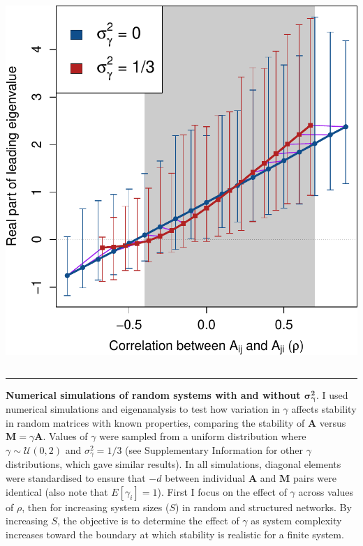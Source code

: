 \documentclass[]{article}
\begin{document}
\includegraphics[height=14cm,keepaspectratio]{fig2.pdf}

\vspace{2mm}
\hrule

\textbf{Numerical simulations of random systems with and without
\(\mathbf{\sigma^{2}_{\gamma}}\)}. I used numerical simulations and
eigenanalysis to test how variation in \(\gamma\) affects stability in
random matrices with known properties, comparing the stability of
\(\textbf{A}\) versus \(\mathbf{M} = \gamma\mathbf{A}\). Values of
\(\gamma\) were sampled from a uniform distribution where
\(\gamma \sim \mathcal{U}(0, 2)\) and \(\sigma^{2}_{\gamma} = 1/3\) (see
Supplementary Information for other \(\gamma\) distributions, which gave
similar results). In all simulations, diagonal elements were
standardised to ensure that \(-d\) between individual \(\textbf{A}\) and
\(\textbf{M}\) pairs were identical (also note that
\(E[\gamma_{i}] = 1\)). First I focus on the effect of \(\gamma\) across
values of \(\rho\), then for increasing system sizes (\(S\)) in random
and structured networks. By increasing \(S\), the objective is to
determine the effect of \(\gamma\) as system complexity increases toward
the boundary at which stability is realistic for a finite system.
\end{document}
